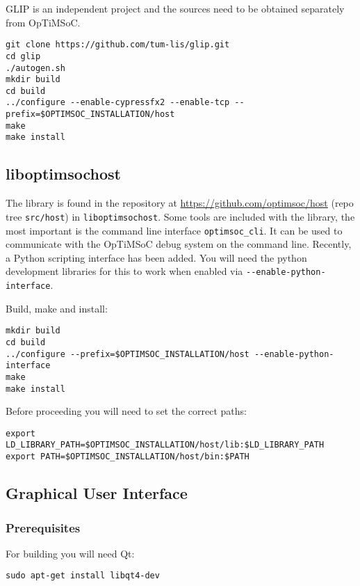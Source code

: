 GLIP is an independent project and the sources need to be obtained separately
from OpTiMSoC.

\begin{lstlisting}
git clone https://github.com/tum-lis/glip.git
cd glip
./autogen.sh
mkdir build
cd build
../configure --enable-cypressfx2 --enable-tcp --prefix=$OPTIMSOC_INSTALLATION/host
make
make install
\end{lstlisting}

\subsection{liboptimsochost}

The library is found in the repository at
\url{https://github.com/optimsoc/host} (repo tree \verb|src/host|) in
\verb|liboptimsochost|.  Some tools are included with the library, the
most important is the command line interface \verb|optimsoc_cli|. It
can be used to communicate with the OpTiMSoC debug system on the
command line. Recently, a Python scripting interface has been
added. You will need the python development libraries for this to work
when enabled via \verb|--enable-python-interface|.

Build, make and install:

\begin{lstlisting}
mkdir build
cd build
../configure --prefix=$OPTIMSOC_INSTALLATION/host --enable-python-interface
make
make install
\end{lstlisting}

Before proceeding you will need to set the correct paths:

\begin{lstlisting}
export LD_LIBRARY_PATH=$OPTIMSOC_INSTALLATION/host/lib:$LD_LIBRARY_PATH
export PATH=$OPTIMSOC_INSTALLATION/host/bin:$PATH
\end{lstlisting}

\subsection{Graphical User Interface}

\subsubsection{Prerequisites}

For building you will need Qt:

\begin{lstlisting}
sudo apt-get install libqt4-dev
\end{lstlisting}

